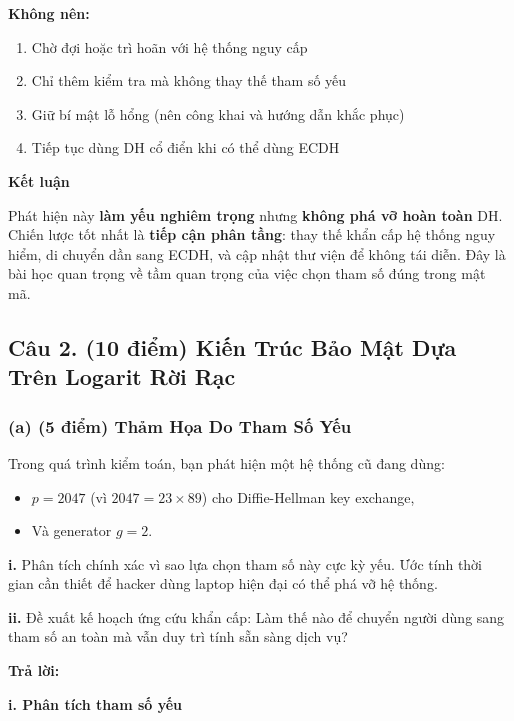 \textbf{Không nên:}
\begin{enumerate}
    \item Chờ đợi hoặc trì hoãn với hệ thống nguy cấp
    \item Chỉ thêm kiểm tra mà không thay thế tham số yếu
    \item Giữ bí mật lỗ hổng (nên công khai và hướng dẫn khắc phục)
    \item Tiếp tục dùng DH cổ điển khi có thể dùng ECDH
\end{enumerate}

\vspace{0.2cm}

\textbf{Kết luận}

Phát hiện này \textbf{làm yếu nghiêm trọng} nhưng \textbf{không phá vỡ hoàn toàn} DH. Chiến lược tốt nhất là \textbf{tiếp cận phân tầng}: thay thế khẩn cấp hệ thống nguy hiểm, di chuyển dần sang ECDH, và cập nhật thư viện để không tái diễn. Đây là bài học quan trọng về tầm quan trọng của việc chọn tham số đúng trong mật mã.

\subsection{Câu 2. (10 điểm) Kiến Trúc Bảo Mật Dựa Trên Logarit Rời Rạc}

\subsubsection{(a) (5 điểm) Thảm Họa Do Tham Số Yếu}

Trong quá trình kiểm toán, bạn phát hiện một hệ thống cũ đang dùng:
\begin{itemize}
    \item $p = 2047$ (vì $2047 = 23 \times 89$) cho Diffie-Hellman key exchange,
    \item Và generator $g = 2$.
\end{itemize}

\textbf{i.} Phân tích chính xác vì sao lựa chọn tham số này cực kỳ yếu.
Ước tính thời gian cần thiết để hacker dùng laptop hiện đại có thể phá vỡ hệ thống.

\textbf{ii.} Đề xuất kế hoạch ứng cứu khẩn cấp:
Làm thế nào để chuyển người dùng sang tham số an toàn mà vẫn duy trì tính sẵn sàng dịch vụ?

\begin{center}
    \textbf{Trả lời:}
\end{center}

\textbf{i. Phân tích tham số yếu}


